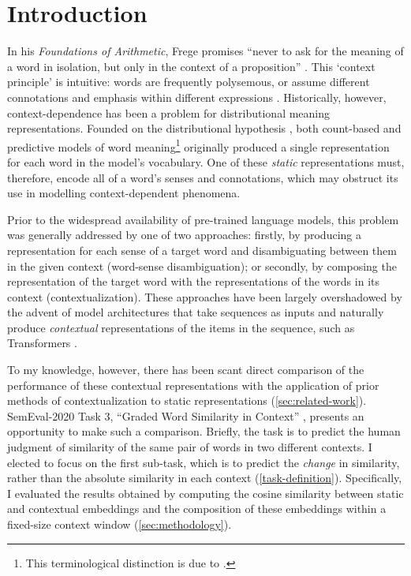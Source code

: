 \section{Introduction}
\label{sec:introduction}

In his \emph{Foundations of Arithmetic}, Frege promises ``never to ask for the meaning
of a word in isolation, but only in the context of a proposition''
\parencite*[xvii]{Frege1980}.
This `context principle' is intuitive: words are frequently polysemous, or assume
different connotations and emphasis within different expressions
\parencite[2-3]{Armendariz2020}.
Historically, however, context-dependence has been a problem for distributional meaning
representations.
Founded on the distributional hypothesis \parencite[e.g.,][142-143]{Turney2010}, both
count-based and predictive models of word meaning\footnote{ This terminological
  distinction is due to \textcite{Baroni2014a}.
} originally
produced a single representation for each word in the model's vocabulary.
One of these \emph{static} representations must, therefore, encode all of a word's
senses and connotations, which may obstruct its use in modelling context-dependent
phenomena.

Prior to the widespread availability of pre-trained language models, this problem was
generally addressed by one of two approaches: firstly, by producing a representation
for each sense of a target word and disambiguating between them in the given context
(word-sense disambiguation); or secondly, by composing the representation of the target
word with the representations of the words in its context (contextualization).
These approaches have been largely overshadowed by the advent of model architectures
that take sequences as inputs and naturally produce \emph{contextual} representations
of the items in the sequence, such as Transformers \parencite{Vaswani2017}.

To my knowledge, however, there has been scant direct comparison of the performance of
these contextual representations with the application of prior methods of
contextualization to static representations (\cref{sec:related-work}).
SemEval-2020 Task 3, ``Graded Word Similarity in Context'' \parencite{Armendariz2020a},
presents an opportunity to make such a comparison.
Briefly, the task is to predict the human judgment of similarity of the same pair of
words in two different contexts.
I elected to focus on the first sub-task, which is to predict the \emph{change} in
similarity, rather than the absolute similarity in each context
(\cref{task-definition}).
Specifically, I evaluated the results obtained by computing the cosine similarity
between static and contextual embeddings and the composition of these embeddings within
a fixed-size context window (\cref{sec:methodology}).
